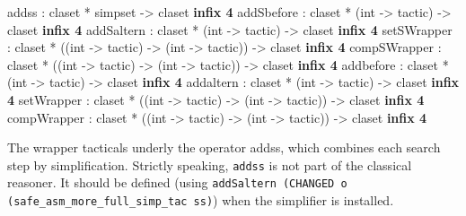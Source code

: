 \begin{ttbox} 
addss        : claset * simpset -> claset                 \hfill{\bf infix 4}
addSbefore   : claset *  (int -> tactic)  -> claset       \hfill{\bf infix 4}
addSaltern   : claset *  (int -> tactic)  -> claset       \hfill{\bf infix 4}
setSWrapper  : claset * ((int -> tactic) -> 
                         (int -> tactic)) -> claset       \hfill{\bf infix 4}
compSWrapper : claset * ((int -> tactic) -> 
                         (int -> tactic)) -> claset       \hfill{\bf infix 4}
addbefore    : claset *  (int -> tactic)  -> claset       \hfill{\bf infix 4}
addaltern    : claset *  (int -> tactic)  -> claset       \hfill{\bf infix 4}
setWrapper   : claset * ((int -> tactic) -> 
                         (int -> tactic)) -> claset       \hfill{\bf infix 4}
compWrapper  : claset * ((int -> tactic) -> 
                         (int -> tactic)) -> claset       \hfill{\bf infix 4}
\end{ttbox}
%
 The wrapper tacticals
underly the operator addss, which combines each search step by
simplification.  Strictly speaking, {\tt addss} is not part of the
classical reasoner.  It should be defined (using {\tt addSaltern
  (CHANGED o (safe_asm_more_full_simp_tac ss)}) when the simplifier is
installed.

